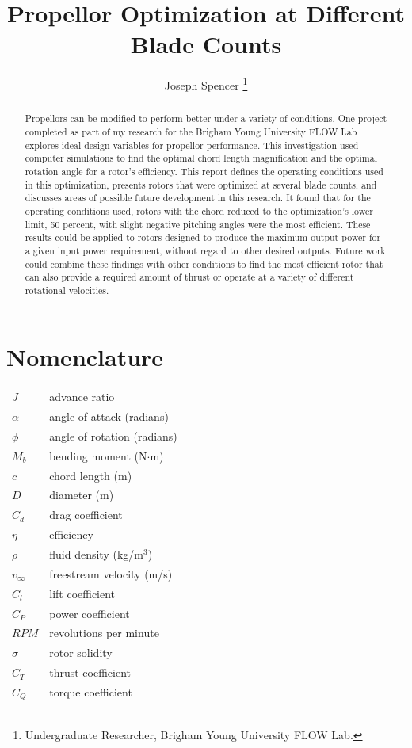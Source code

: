 \documentclass[journal ]{new-aiaa}
\title{Propellor Optimization at Different Blade Counts}
\author{Joseph Spencer \footnote{Undergraduate Researcher, Brigham Young University FLOW Lab.}}
\affil{Brigham Young University, Provo, Utah, 84601}
\begin{document}
\maketitle

\begin{abstract}

Propellors can be modified to perform better under a variety of conditions. One project completed as part of my research for the Brigham Young University FLOW Lab explores ideal design variables for propellor performance. This investigation used computer simulations to find the optimal chord length magnification and the optimal rotation angle for a rotor's efficiency. This report defines the operating conditions used in this optimization, presents rotors that were optimized at several blade counts, and discusses areas of possible future development in this research. It found that for the operating conditions used, rotors with the chord reduced to the optimization's lower limit, 50 percent, with slight negative pitching angles were the most efficient. These results could be applied to rotors designed to produce the maximum output power for a given input power requirement, without regard to other desired outputs. Future work could combine these findings with other conditions to find the most efficient rotor that can also provide a required amount of thrust or operate at a variety of different rotational velocities.

\end{abstract}


\section*{Nomenclature}

{\renewcommand\arraystretch{1.0}
\noindent\begin{longtable*}{@{}l @{\quad \quad} l@{}}

$J$ & advance ratio \\
$\alpha$ & angle of attack (radians) \\
$\phi$ & angle of rotation (radians) \\
$M_{b}$ & bending moment (N$\cdot$m) \\
$c$ & chord length (m) \\
$D$ & diameter (m) \\
$C_{d}$ & drag coefficient \\
$\eta$ & efficiency \\
$\rho$ & fluid density (kg/m$^{3}$) \\
$v_{\infty}$ & freestream velocity (m/s) \\
$C_{l}$ & lift coefficient \\
$C_{P}$ & power coefficient \\
$RPM$ & revolutions per minute \\
$\sigma$ & rotor solidity \\
$C_{T}$ & thrust coefficient \\
$C_{Q}$ & torque coefficient \\

\end{longtable*}}
\end{document}
